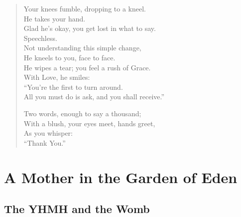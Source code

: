 \documentclass[12pt]{amsart}
\begin{document}
\begin{verse}
Your knees fumble, dropping to a kneel.\\
He takes your hand.\\
Glad he’s okay, you get lost in what to say.\\
Speechless.\\
Not understanding this simple change,\\
He kneels to you, face to face.\\
He wipes a tear; you feel a rush of Grace.\\
With Love, he smiles:\\
``You’re the first to turn around.\\
All you must do is ask, and you shall receive.''

Two words, enough to say a thousand;\\
With a blush, your eyes meet, hands greet,\\
As you whisper:\\
``Thank You.''
\end{verse}

\newpage

\section*{A Mother in the Garden of Eden}
\subsection*{The YHMH and the Womb}
\end{document}
